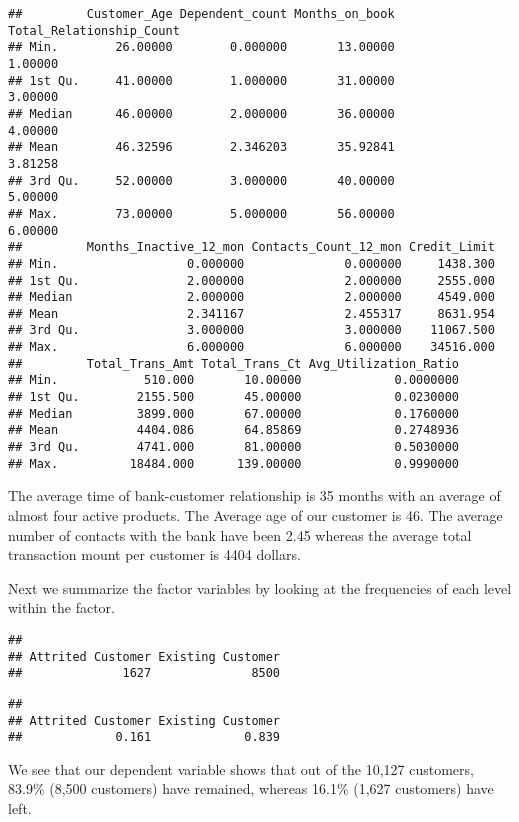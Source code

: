 \documentclass[
]{article}
\begin{document}
\begin{verbatim}
##         Customer_Age Dependent_count Months_on_book Total_Relationship_Count
## Min.        26.00000        0.000000       13.00000                  1.00000
## 1st Qu.     41.00000        1.000000       31.00000                  3.00000
## Median      46.00000        2.000000       36.00000                  4.00000
## Mean        46.32596        2.346203       35.92841                  3.81258
## 3rd Qu.     52.00000        3.000000       40.00000                  5.00000
## Max.        73.00000        5.000000       56.00000                  6.00000
##         Months_Inactive_12_mon Contacts_Count_12_mon Credit_Limit
## Min.                  0.000000              0.000000     1438.300
## 1st Qu.               2.000000              2.000000     2555.000
## Median                2.000000              2.000000     4549.000
## Mean                  2.341167              2.455317     8631.954
## 3rd Qu.               3.000000              3.000000    11067.500
## Max.                  6.000000              6.000000    34516.000
##         Total_Trans_Amt Total_Trans_Ct Avg_Utilization_Ratio
## Min.            510.000       10.00000             0.0000000
## 1st Qu.        2155.500       45.00000             0.0230000
## Median         3899.000       67.00000             0.1760000
## Mean           4404.086       64.85869             0.2748936
## 3rd Qu.        4741.000       81.00000             0.5030000
## Max.          18484.000      139.00000             0.9990000
\end{verbatim}

The average time of bank-customer relationship is 35 months with an
average of almost four active products. The Average age of our customer
is 46. The average number of contacts with the bank have been 2.45
whereas the average total transaction mount per customer is 4404
dollars.

Next we summarize the factor variables by looking at the frequencies of
each level within the factor.

\begin{verbatim}
## 
## Attrited Customer Existing Customer 
##              1627              8500
\end{verbatim}

\begin{verbatim}
## 
## Attrited Customer Existing Customer 
##             0.161             0.839
\end{verbatim}

We see that our dependent variable shows that out of the 10,127
customers, 83.9\% (8,500 customers) have remained, whereas 16.1\% (1,627
customers) have left.
\end{document}
